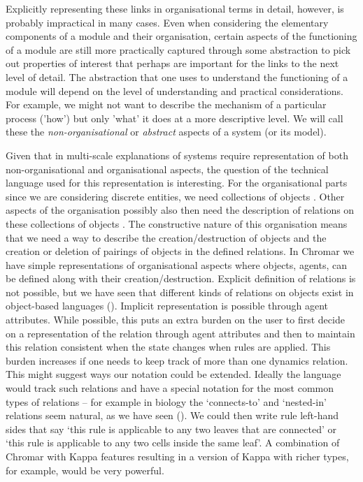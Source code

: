 Explicitly representing these links in organisational terms in detail, however,
is probably impractical in many cases. Even when considering the elementary
components of a module and their organisation, certain aspects of the
functioning of a module are still more practically captured through some
abstraction to pick out properties of interest that perhaps are important for
the links to the next level of detail. The abstraction that one uses to
understand the functioning of a module will depend on the level of understanding
and practical considerations. For example, we might not want to describe the
mechanism of a particular process ('how') but only 'what' it does at a more
descriptive level.  We will call these the \emph{non-organisational} or
\emph{abstract} aspects of a system (or its model).

Given that in multi-scale explanations of systems require representation of both
non-organisational and organisational aspects, the question of the technical
language used for this representation is interesting. For the organisational
parts since we are considering discrete entities, we need collections of objects
\citep{fontana_barrier_1996}. Other aspects of the organisation possibly also
then need the description of relations on these collections of objects
\citep{rashevsky_topology_1954, rosen_relational_1958}. The constructive nature
of this organisation means that we need a way to describe the
creation/destruction of objects and the creation or deletion of pairings of
objects in the defined relations. In Chromar we have simple representations of
organisational aspects where objects, agents, can be defined along with their
creation/destruction. Explicit definition of relations is not possible, but we
have seen that different kinds of relations on objects exist in object-based
languages (). Implicit representation is possible through agent
attributes. While possible, this puts an extra burden on the user to first
decide on a representation of the relation through agent attributes and then to
maintain this relation consistent when the state changes when rules are
applied. This burden increases if one needs to keep track of more than one
dynamics relation. This might suggest ways our notation could be
extended. Ideally the language would track such relations and have a special
notation for the most common types of relations -- for example in biology the
`connects-to' and `nested-in' relations seem natural, as we have seen
(). We could then write rule left-hand sides that say `this
rule is applicable to any two leaves that are connected' or `this rule is
applicable to any two cells inside the same leaf'. A combination of Chromar with
Kappa features resulting in a version of Kappa with richer types, for example,
would be very powerful.

